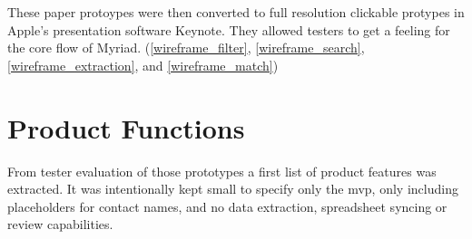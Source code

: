 
These paper protoypes were then converted to full resolution clickable protypes in Apple's presentation software Keynote. They allowed testers to get a feeling for the core flow of Myriad. (\autoref{wireframe_filter}, \autoref{wireframe_search}, \autoref{wireframe_extraction}, and \autoref{wireframe_match})





\section{Product Functions}

From tester evaluation of those prototypes a first list of product features was extracted. It was intentionally kept small to specify only the \acrfull{mvp}, only including placeholders for contact names, and no data extraction, spreadsheet syncing or review capabilities.

